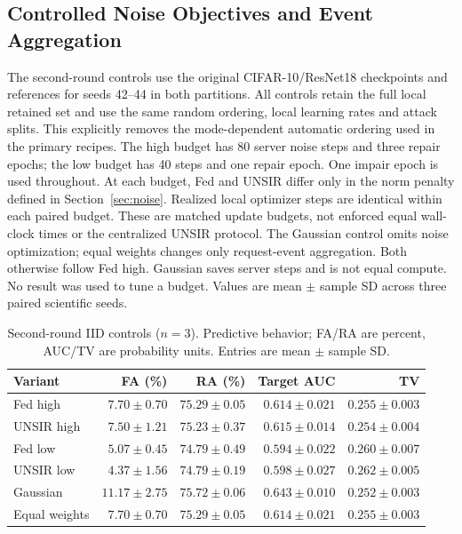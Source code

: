 \documentclass[software,article,submit,moreauthors]{Definitions/mdpi}
\begin{document}
\subsection{Controlled Noise Objectives and Event Aggregation}
\label{sec:round2-controls}
The second-round controls use the original CIFAR-10/ResNet18 checkpoints and
references for seeds 42--44 in both partitions. All controls retain the full
local retained set and use the same random ordering, local learning rates and
attack splits. This explicitly removes the mode-dependent automatic ordering
used in the primary recipes. The high budget has 80 server noise steps and
three repair epochs; the low budget has 40 steps and one repair epoch. One
impair epoch is used throughout. At each budget, Fed and UNSIR differ only in
the norm penalty defined in Section~\ref{sec:noise}. Realized local optimizer
steps are identical within each paired budget. These are matched update
budgets, not enforced equal wall-clock times or the centralized UNSIR protocol.
The Gaussian control omits noise optimization; equal weights changes only
request-event aggregation. Both otherwise follow Fed high. Gaussian saves
server steps and is not equal compute. No result was used to tune a budget.
Values are mean $\pm$ sample SD across three paired scientific seeds.
\begin{table}[H]\centering\footnotesize\setlength{\tabcolsep}{4pt}
\caption{Second-round IID controls ($n=3$). Predictive behavior; FA/RA are percent, AUC/TV are probability units. Entries are mean $\pm$ sample SD.}
\label{tab:round2-iid}
\begin{tabular}{lrrrr}\toprule Variant & FA (\%) & RA (\%) & Target AUC & TV\\\midrule
Fed high & $7.70 \pm 0.70$ & $75.29 \pm 0.05$ & $0.614 \pm 0.021$ & $0.255 \pm 0.003$\\
UNSIR high & $7.50 \pm 1.21$ & $75.23 \pm 0.37$ & $0.615 \pm 0.014$ & $0.254 \pm 0.004$\\
Fed low & $5.07 \pm 0.45$ & $74.79 \pm 0.49$ & $0.594 \pm 0.022$ & $0.260 \pm 0.007$\\
UNSIR low & $4.37 \pm 1.56$ & $74.79 \pm 0.19$ & $0.598 \pm 0.027$ & $0.262 \pm 0.005$\\
Gaussian & $11.17 \pm 2.75$ & $75.72 \pm 0.06$ & $0.643 \pm 0.010$ & $0.252 \pm 0.003$\\
Equal weights & $7.70 \pm 0.70$ & $75.29 \pm 0.05$ & $0.614 \pm 0.021$ & $0.255 \pm 0.003$\\
\bottomrule\end{tabular}\end{table}
\end{document}
